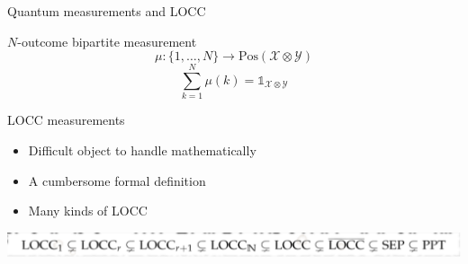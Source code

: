 \documentclass{beamer}
\def\I{\mathds{1}}
\def\X{\mathcal{X}}
\def\Y{\mathcal{Y}}
\newcommand{\setft}[1]{\mathrm{#1}}
\newcommand{\Pos}{\setft{Pos}}
\begin{document}
    \begin{frame}{Quantum measurements and LOCC}
        \begin{block}{$N$-outcome bipartite measurement}        
        \[
            \mu : \{ 1, \ldots, N \} \to \Pos(\X\otimes\Y)
        \]
        \[
            \sum_{k=1}^{N}\mu(k) = \I_{\X\otimes\Y}
        \]
        \end{block}
        
        \begin{block}{LOCC measurements}
          \begin{itemize}
            \item Difficult object to handle mathematically
            \item A cumbersome formal definition 
            \item Many kinds of LOCC
          \end{itemize}
          \begin{center}
            \includegraphics[scale=0.35]{locc.pdf}
            \vskip-1mm
            \hspace*{}
          \end{center}
        \end{block}        
    \end{frame}
\end{document}
